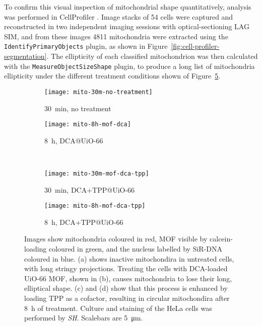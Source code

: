 To confirm this visual inspection of mitochondrial shape quantitatively, analysis was performed in CellProfiler \cite{carpenter2006cellprofiler}.
Image stacks of 54 cells were captured and reconstructed in two independent imaging sessions with optical-sectioning LAG SIM, and from these images \num{4811} mitochondria were extracted using the \texttt{IdentifyPrimaryObjects} plugin, as shown in Figure~\ref{fig:cell-profiler-segmentation}.
The ellipticity of each classified mitochondrion was then calculated with the \texttt{MeasureObjectSizeShape} plugin, to produce a long list of mitochondria ellipticity under the different treatment conditions shown of Figure~\ref{fig:mito-SIM-images}.

\begin{figure}[p]
\centering
	\begin{subfigure}[b]{0.49\textwidth}
	\texttt{[image: mito-30m-no-treatment]}
	\caption{\SI{30}{\minute}, no treatment} \label{fig:mito-30m-no-treatment}
	\end{subfigure}
	\hfill
	\begin{subfigure}[b]{0.49\textwidth}
	\texttt{[image: mito-8h-mof-dca]}
	\caption{\SI{8}{\hour}, DCA@UiO-66} \label{fig:mito-8h-mof-dca}
	\end{subfigure}

	~\newline
		\begin{subfigure}[b]{0.49\textwidth}
	\texttt{[image: mito-30m-mof-dca-tpp]}
	\caption{\SI{30}{\minute}, DCA+TPP@UiO-66}\label{fig:mito-30m-mof-dca-tpp}
	\end{subfigure}
	\hfill
	\begin{subfigure}[b]{0.49\textwidth}
	\texttt{[image: mito-8h-mof-dca-tpp]}
	\caption{\SI{8}{\hour}, DCA+TPP@UiO-66}\label{fig:mito-8h-mof-dca-tpp}
	\end{subfigure}
\caption[MOFs: UiO-66 MOF loaded with DCA changes mitochondria's shape]{Images show mitochondria coloured in red, MOF visible by calcein-loading coloured in green, and the nucleus labelled by SiR-DNA coloured in blue. (a) shows inactive mitochondira in untreated cells, with long stringy projections. Treating the cells with DCA-loaded UiO-66 MOF, shown in (b), causes mitochondria to lose their long, elliptical shape. (c) and (d) show that this process is enhanced by loading TPP as a cofactor, resulting in circular mitochondira after \SI{8}{\hour} of treatment. Culture and staining of the HeLa cells was performed by \textit{SH}. Scalebars are \SI{5}{\micro\metre}. }
\label{fig:mito-SIM-images}
\end{figure}
